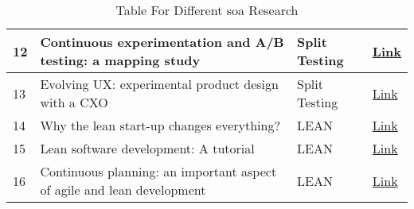 \begin{table}[htbp!]
\begin{tabular}{| m{0.8em} || m{13em} | m{13em} | m{4em} | }
    \hline
    12 & Continuous experimentation and A/B testing: a mapping study & Split Testing & \href{https://dl.acm.org/doi/abs/10.1145/3194760.3194766/}{Link} \\
    \hline
    13 & Evolving UX: experimental product design with a CXO & Split Testing & \href{https://uxdesign.cc/evolving-ux-experimental-product-design-with-a-cxo-2c0865db80cc}{Link} \\
    \hline
    14 & Why the lean start-up changes everything? & LEAN & \href{https://hbr.org/2013/05/why-the-lean-start-up-changes-everything}{Link} \\
    \hline
    15 & Lean software development: A tutorial & LEAN & \href{https://ieeexplore.ieee.org/abstract/document/6226341}{Link} \\
    \hline
    16 & Continuous planning: an important aspect of agile and lean development & LEAN & \href{https://www.inderscienceonline.com/doi/abs/10.1504/IJASM.2015.070607}{Link} \\
    \hline
    \end{tabular}
    \caption[Literature Review]{Table For Different \ac{soa} Research}
    \label{table:appendix:literature:review}
\end{table}